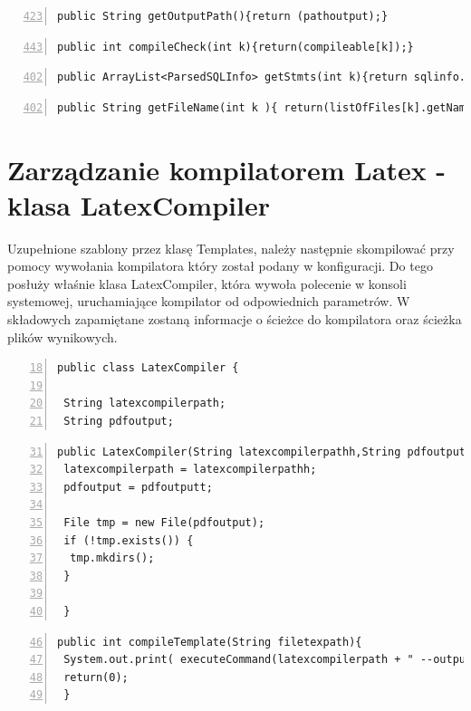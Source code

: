 \begin{lstlisting}[numbers=left,firstnumber=423]
 public String getOutputPath(){return (pathoutput);}
     \end{lstlisting}
     
 \begin{lstlisting}[numbers=left,firstnumber=443]
 public int compileCheck(int k){return(compileable[k]);}
     \end{lstlisting}
     
 \begin{lstlisting}[numbers=left,firstnumber=402]
 public ArrayList<ParsedSQLInfo> getStmts(int k){return sqlinfo.get(k);}
     \end{lstlisting}
     
 \begin{lstlisting}[numbers=left,firstnumber=402]
 public String getFileName(int k ){ return(listOfFiles[k].getName());}
     \end{lstlisting}


\section{Zarządzanie kompilatorem Latex - klasa LatexCompiler}

Uzupełnione szablony przez klasę Templates, należy następnie skompilować przy pomocy wywołania kompilatora który został podany w konfiguracji.
Do tego posłuży właśnie klasa LatexCompiler, która wywoła polecenie w konsoli systemowej, uruchamiające kompilator od odpowiednich parametrów.
W składowych zapamiętane zostaną informacje o ścieżce do kompilatora oraz ścieżka plików wynikowych.

 \begin{lstlisting}[numbers=left,firstnumber=18]
public class LatexCompiler {
    
 String latexcompilerpath;
 String pdfoutput;
     \end{lstlisting}


 \begin{lstlisting}[numbers=left,firstnumber=31]
public LatexCompiler(String latexcompilerpathh,String pdfoutputt){
 latexcompilerpath = latexcompilerpathh;
 pdfoutput = pdfoutputt;

 File tmp = new File(pdfoutput);
 if (!tmp.exists()) {
  tmp.mkdirs();
 }
    
 }
\end{lstlisting}


 \begin{lstlisting}[numbers=left,firstnumber=46]
public int compileTemplate(String filetexpath){
 System.out.print( executeCommand(latexcompilerpath + " --output-directory=" + pdfoutput + " " + filetexpath));
 return(0);
 }
\end{lstlisting}

